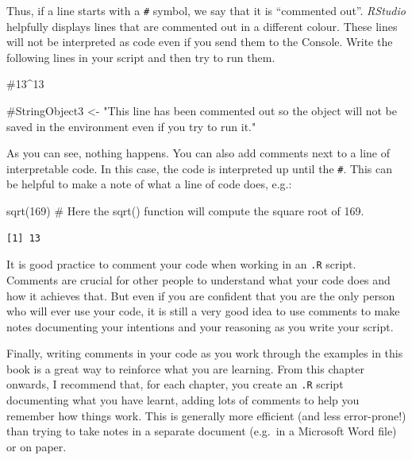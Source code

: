 \documentclass[
  letterpaper,
  DIV=11,
  numbers=noendperiod]{scrreprt}
\newenvironment{Shaded}{\begin{snugshade}}{\end{snugshade}}
\newcommand{\CommentTok}[1]{\textcolor[rgb]{0.37,0.37,0.37}{#1}}
\newcommand{\DecValTok}[1]{\textcolor[rgb]{0.68,0.00,0.00}{#1}}
\newcommand{\FunctionTok}[1]{\textcolor[rgb]{0.28,0.35,0.67}{#1}}
\newcommand{\NormalTok}[1]{\textcolor[rgb]{0.00,0.23,0.31}{#1}}
\begin{document}
Thus, if a line starts with a \texttt{\#} symbol, we say that it is
``commented out''. \emph{RStudio} helpfully displays lines that are
commented out in a different colour. These lines will not be interpreted
as code even if you send them to the Console. Write the following lines
in your script and then try to run them.

\begin{Shaded}
\begin{Highlighting}[]
\CommentTok{\#13\^{}13}

\CommentTok{\#StringObject3 \textless{}{-} "This line has been commented out so the object will not be saved in the environment even if you try to run it."}
\end{Highlighting}
\end{Shaded}

As you can see, nothing happens. You can also add comments next to a
line of interpretable code. In this case, the code is interpreted up
until the \texttt{\#}. This can be helpful to make a note of what a line
of code does, e.g.:

\begin{Shaded}
\begin{Highlighting}[]
\FunctionTok{sqrt}\NormalTok{(}\DecValTok{169}\NormalTok{) }\CommentTok{\# Here the sqrt() function will compute the square root of 169.}
\end{Highlighting}
\end{Shaded}

\begin{verbatim}
[1] 13
\end{verbatim}

It is good practice to comment your code when working in an \texttt{.R}
script. Comments are crucial for other people to understand what your
code does and how it achieves that. But even if you are confident that
you are the only person who will ever use your code, it is still a very
good idea to use comments to make notes documenting your intentions and
your reasoning as you write your script.

Finally, writing comments in your code as you work through the examples
in this book is a great way to reinforce what you are learning. From
this chapter onwards, I recommend that, for each chapter, you create an
\texttt{.R} script documenting what you have learnt, adding lots of
comments to help you remember how things work. This is generally more
efficient (and less error-prone!) than trying to take notes in a
separate document (e.g.~in a Microsoft Word file) or on paper.
\end{document}
